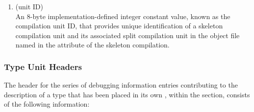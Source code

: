 \begin{enumerate}[1. ]
\item \HFNdwoid{} (unit ID) \\
An 8-byte implementation-defined integer constant value, 
known as the compilation unit ID, that provides 
unique identification of a skeleton compilation 
unit and its associated split compilation unit in 
the object file named in the \DWATdwoname{} attribute
of the skeleton compilation.

\bbpareb
\end{enumerate}

\subsubsection{Type Unit Headers}
\label{datarep:typeunitheaders}
The header for the series of debugging information entries
contributing to the description of a type that has been
placed in its own , within the 
\dotdebuginfo{} section,
consists of the following information:
